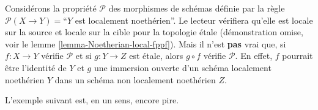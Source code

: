 \begin{example}
\label{example-silly-one}
Considérons la propriété $\mathcal{P}$ des morphismes de schémas définie par
la règle $\mathcal{P}(X \to Y) = $``$Y$ est localement noethérien''.
Le lecteur vérifiera qu'elle est locale sur la source et locale sur la cible
pour la topologie \'etale (démonstration omise, voir le
lemme \ref{lemma-Noetherian-local-fppf}).
Mais il n'est {\bf pas} vrai que, si $f : X \to Y$ vérifie $\mathcal{P}$
et si $g : Y \to Z$ est \'etale, alors $g \circ f$ vérifie $\mathcal{P}$.
En effet, $f$ pourrait être l'identité de $Y$ et $g$ une immersion ouverte
d'un schéma localement noethérien $Y$ dans un schéma non localement
noethérien $Z$.
\end{example}

\noindent
L'exemple suivant est, en un sens, encore pire.

